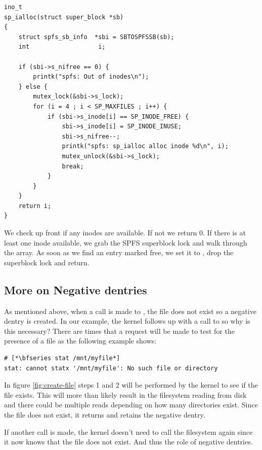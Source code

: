 \begin{lstlisting}
ino_t
sp_ialloc(struct super_block *sb)
{
    struct spfs_sb_info  *sbi = SBTOSPFSSB(sb);
    int                   i;

    if (sbi->s_nifree == 0) {
        printk("spfs: Out of inodes\n");
    } else {
        mutex_lock(&sbi->s_lock);
        for (i = 4 ; i < SP_MAXFILES ; i++) {
            if (sbi->s_inode[i] == SP_INODE_FREE) {
                sbi->s_inode[i] = SP_INODE_INUSE;
                sbi->s_nifree--;
                printk("spfs: sp_ialloc alloc inode %d\n", i);
                mutex_unlock(&sbi->s_lock);
                break;
            }
        }
    }
    return i;
}
\end{lstlisting}

\noindent
We check up front if any inodes are available. If not we return 0. If there is at least one inode available, we grab the SPFS superblock lock and walk through the array. As soon as we find an entry marked free, we set it to , drop the superblock lock and return.


\subsection{More on Negative dentries}

As mentioned above, when a call is made to , the file  does not exist so a negative dentry is created. In our example, the kernel follows up with a call to  so why is this necessary? There are times that a request will be made to test for the presence of a file as the following example shows:

\begin{lstlisting}
# [*\bfseries stat /mnt/myfile*]
stat: cannot statx '/mnt/myfile': No such file or directory
\end{lstlisting}

\noindent
In figure \ref{fig:create-file} steps 1 and 2 will be performed by the kernel to see if the file exists. This will more than likely result in the filesystem reading from disk and there could be multiple reads depending on how many directories exist. Since the file does not exist, it returns  and retains the negative dentry.

If another  call is made, the kernel doesn't need to call the filesystem again since it now knows that the file does not exist. And thus the role of negative dentries.

